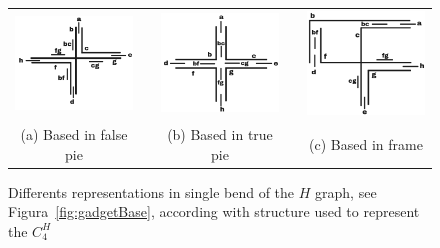 \begin{figure}[htb]
  \centering
  \begin{tabular}{c c c c c }
    \includegraphics[width=4cm]{./img/falsePie.png}  %
    & &\includegraphics[width=4cm]{./img/truePie.png} %
    & &
 \includegraphics[width=4cm]{./img/frame.png} \\%
    {\footnotesize (a) Based in false pie}  & &  {\footnotesize(b) Based in true pie} & & {\footnotesize (c) Based in frame} %
  \end{tabular}
  \caption{Differents representations in single bend of the $H$ graph, see Figura~\ref{fig:gadgetBase}, according with structure used to represent the $C_4^H$}\label{fig:falsepietruepieframe}
\end{figure} 